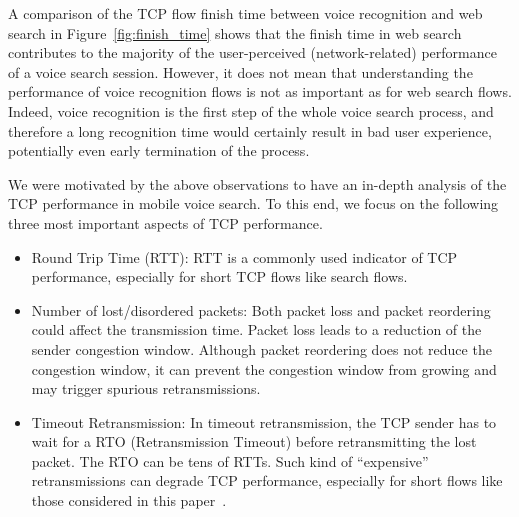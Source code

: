 A comparison of the TCP flow finish time between voice recognition and web search in Figure~\ref{fig:finish_time} shows that the finish time in web search contributes to the majority of the user-perceived (network-related) performance of a voice search session. However, it does not mean that understanding the performance of voice recognition flows is not as important as for web search flows. Indeed, voice recognition is the first step of the whole voice search process, and therefore a long recognition time would certainly result in bad user experience, potentially even early termination of the process.



We were motivated by the above observations to have an in-depth analysis of the TCP performance in mobile voice search. To this end, we focus on the following three most important aspects of TCP performance.

\begin{itemize}
	\item {Round Trip Time (RTT):} RTT is a commonly used indicator of TCP performance, especially for short TCP flows like search flows.
	
	\item {Number of lost/disordered packets:} Both packet loss and packet reordering could affect the transmission time. Packet loss leads to a reduction of the sender congestion window. Although packet reordering does not reduce the congestion window, it can prevent the congestion window from growing and may trigger spurious retransmissions.
	
	\item {Timeout Retransmission:} In timeout retransmission, the TCP sender has to wait for a RTO (Retransmission Timeout) before retransmitting the lost packet. The RTO can be tens of RTTs. Such kind of ``expensive'' retransmissions can degrade TCP performance, especially for short flows like those considered in this paper~\cite{flach2013reducing}.

\end{itemize}

